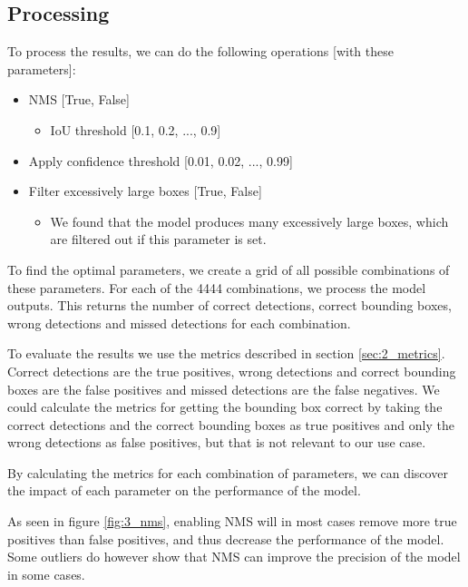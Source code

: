 \subsection{Processing}
To process the results, we can do the following operations [with these parameters]:
\begin{itemize}
    \item NMS [True, False]
    \begin{itemize}
        \item IoU threshold [0.1, 0.2, ..., 0.9]
    \end{itemize}
    \item Apply confidence threshold [0.01, 0.02, ..., 0.99]
    \item Filter excessively large boxes [True, False]
    \begin{itemize}
        \item We found that the model produces many excessively large boxes, which are filtered out if this parameter is set. 
    \end{itemize}
\end{itemize}
To find the optimal parameters, we create a grid of all possible combinations of these parameters. For each of the 4444 combinations, we process the model outputs. This returns the number of correct detections, correct bounding boxes, wrong detections and missed detections for each combination.

To evaluate the results we use the metrics described in section \ref{sec:2_metrics}. Correct detections are the true positives, wrong detections and correct bounding boxes are the false positives and missed detections are the false negatives. We could calculate the metrics for getting the bounding box correct by taking the correct detections and the correct bounding boxes as true positives and only the wrong detections as false positives, but that is not relevant to our use case.

By calculating the metrics for each combination of parameters, we can discover the impact of each parameter on the performance of the model. 

As seen in figure \ref{fig:3_nms}, enabling NMS will in most cases remove more true positives than false positives, and thus decrease the performance of the model. Some outliers do however show that NMS can improve the precision of the model in some cases.

